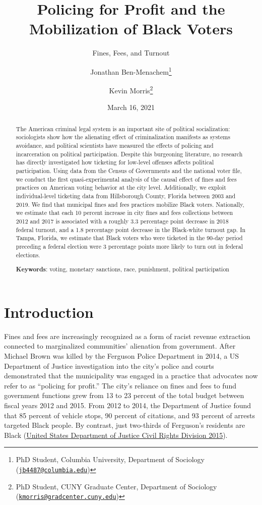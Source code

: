 \documentclass[
  12pt,
]{article}
\title{Policing for Profit and the Mobilization of Black Voters}
\subtitle{Fines, Fees, and Turnout}
\author{Jonathan Ben-Menachem\footnote{PhD Student, Columbia University, Department of Sociology (\href{mailto:jb4487@columbia.edu}{\nolinkurl{jb4487@columbia.edu}})} \and Kevin Morris\footnote{PhD Student, CUNY Graduate Center, Department of Sociology (\href{mailto:kmorris@gradcenter.cuny.edu}{\nolinkurl{kmorris@gradcenter.cuny.edu}})}}
\date{March 16, 2021}
\begin{document}
\maketitle
\begin{abstract}
The American criminal legal system is an important site of political socialization: sociologists show how the alienating effect of criminalization manifests as systems avoidance, and political scientists have measured the effects of policing and incarceration on political participation. Despite this burgeoning literature, no research has directly investigated how ticketing for low-level offenses affects political participation. Using data from the Census of Governments and the national voter file, we conduct the first quasi-experimental analysis of the causal effect of fines and fees practices on American voting behavior at the city level. Additionally, we exploit individual-level ticketing data from Hillsborough County, Florida between 2003 and 2019. We find that municipal fines and fees practices mobilize Black voters. Nationally, we estimate that each 10 percent increase in city fines and fees collections between 2012 and 2017 is associated with a roughly 3.3 percentage point decrease in 2018 federal turnout, and a 1.8 percentage point decrease in the Black-white turnout gap. In Tampa, Florida, we estimate that Black voters who were ticketed in the 90-day period preceding a federal election were 3 percentage points more likely to turn out in federal elections.

\hfill\break

\textbf{Keywords}: voting, monetary sanctions, race, punishment, political participation
\end{abstract}

\pagebreak

\doublespacing

\hypertarget{introduction}{%
\section*{Introduction}\label{introduction}}

Fines and fees are increasingly recognized as a form of racist revenue extraction connected to marginalized communities' alienation from government. After Michael Brown was killed by the Ferguson Police Department in 2014, a US Department of Justice investigation into the city's police and courts demonstrated that the municipality was engaged in a practice that advocates now refer to as ``policing for profit.'' The city's reliance on fines and fees to fund government functions grew from 13 to 23 percent of the total budget between fiscal years 2012 and 2015. From 2012 to 2014, the Department of Justice found that 85 percent of vehicle stops, 90 percent of citations, and 93 percent of arrests targeted Black people. By contrast, just two-thirds of Ferguson's residents are Black (\protect\hyperlink{ref-UnitedStatesDepartmentofJusticeCivilRightsDivision2015}{United States Department of Justice Civil Rights Division 2015}).
\end{document}
